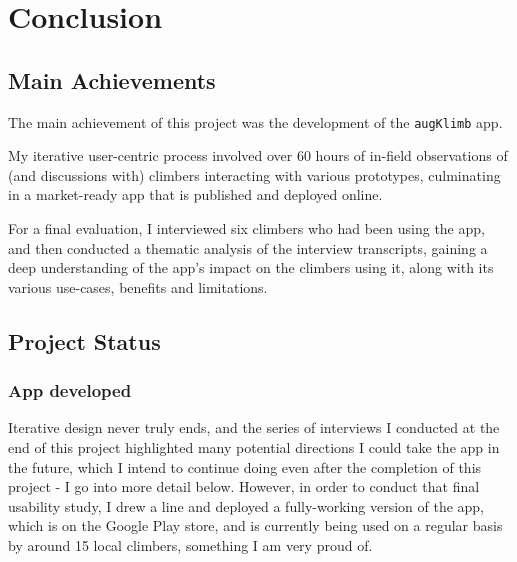 \chapter{Conclusion}
\label{chap:conclusion}


\section{Main Achievements}
The main achievement of this project was the development of the \verb|augKlimb| app.

My iterative user-centric process involved over $60$ hours of in-field observations of (and discussions with) climbers interacting with various prototypes, culminating in a market-ready app that is published and deployed online.

For a final evaluation, I interviewed six climbers who had been using the app, and then conducted a thematic analysis of the interview transcripts, gaining a deep understanding of the app's impact on the climbers using it, along with its various use-cases, benefits and limitations. 





\section{Project Status}
\subsection{App developed}
Iterative design never truly ends, and the series of interviews I conducted at the end of this project highlighted many potential directions I could take the app in the future, which I intend to continue doing even after the completion of this project - I go into more detail below.
However, in order to conduct that final usability study, I drew a line and deployed a fully-working version of the app, which is on the Google Play store, and is currently being used on a regular basis by around 15 local climbers, something I am very proud of.

